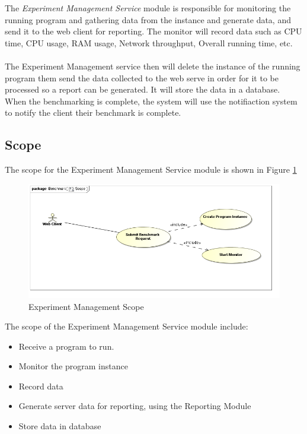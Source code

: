 The \textit{Experiment Management Service} module is responsible for monitoring the running
program and gathering data from the instance and generate data, and send it to
the web client for reporting. The monitor will record data such as CPU time,
CPU usage, RAM usage, Network throughput, Overall running time, etc.
\\
\\
The Experiment Management service then will delete the instance of the running program them
send the data collected to the web serve in order for it to be processed so a
report can be generated. It will store the data in a database. When the benchmarking
is complete, the system will use the notifiaction system to notify the client their
benchmark is complete.


\subsection{Scope}
The scope for the Experiment Management Service module is shown in Figure \ref{Benchmark Scope}
\begin{figure}[H]
  \begin{center}
  \includegraphics[scale=0.5]{../Diagrams and Charts/Benchmark/Scope.png}
  \caption{Experiment Management Scope}
  \end{center}
  \label{Benchmark Scope}
\end{figure}
The scope of the Experiment Management Service module include:
\begin{itemize}
	\item Receive a program to run.
  \item Monitor the program instance
  \item Record data
  \item Generate server data for reporting, using the Reporting Module
  \item Store data in database
\end{itemize}

